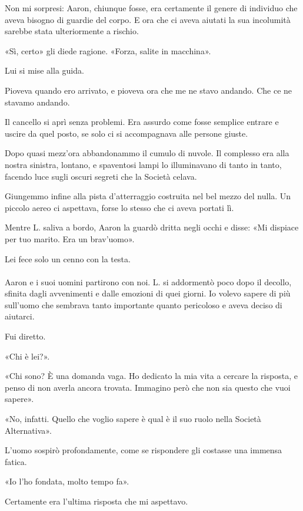 \documentclass[a4paper,12pt]{book}
\begin{document}
Non mi sorpresi: Aaron, chiunque fosse, era certamente il genere di individuo
che aveva bisogno di guardie del corpo. E ora che ci aveva aiutati la sua
incolumità sarebbe stata ulteriormente a rischio.

«Sì, certo» gli diede ragione. «Forza, salite in macchina».

Lui si mise alla guida.

Pioveva quando ero arrivato, e pioveva ora che me ne stavo andando. Che ce ne
stavamo andando.

Il cancello si aprì senza problemi. Era assurdo come fosse semplice entrare e
uscire da quel posto, se solo ci si accompagnava alle persone giuste.

Dopo quasi mezz'ora abbandonammo il cumulo di nuvole. Il complesso era alla
nostra sinistra, lontano, e spaventosi lampi lo illuminavano di tanto in tanto,
facendo luce sugli oscuri segreti che la Società celava.

Giungemmo infine alla pista d'atterraggio costruita nel bel mezzo del nulla.
Un piccolo aereo ci aspettava, forse lo stesso che ci aveva portati lì.

Mentre L. saliva a bordo, Aaron la guardò dritta negli occhi e disse: «Mi
dispiace per tuo marito. Era un brav'uomo».

Lei fece solo un cenno con la testa.

\paragraph{}
Aaron e i suoi uomini partirono con noi. L. si addormentò poco dopo il decollo,
sfinita dagli avvenimenti e dalle emozioni di quei giorni. Io volevo sapere di
più sull'uomo che sembrava tanto importante quanto pericoloso e aveva deciso di
aiutarci.

Fui diretto.

«Chi è lei?».

«Chi sono? È una domanda vaga. Ho dedicato la mia vita a cercare la risposta,
e penso di non averla ancora trovata. Immagino però che non sia questo che vuoi
sapere».

«No, infatti. Quello che voglio sapere è qual è il suo ruolo nella Società
Alternativa».

L'uomo sospirò profondamente, come se rispondere gli costasse una immensa
fatica.

«Io l'ho fondata, molto tempo fa».

Certamente era l'ultima risposta che mi aspettavo.
\end{document}
